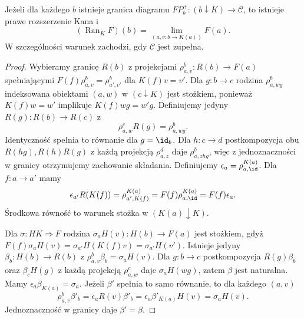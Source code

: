 \begin{twierdzenie}\label{cat:thm:pointwise-ran}
Jeżeli dla każdego $b$ istnieje granica diagramu $FP_b^+:(b\downarrow K)\to\mathcal C$, to istnieje prawe rozszerzenie Kana i
\[
 (\operatorname{Ran}_K F)(b)=\lim_{(a,v:b\to K(a))}F(a).
\]
W szczególności warunek zachodzi, gdy $\mathcal C$ jest zupełna.
\end{twierdzenie}
\begin{proof}
Wybieramy granicę $R(b)$ z projekcjami $\rho^b_{a,v}:R(b)\to F(a)$ spełniającymi $F(f)\rho^b_{a,v}=\rho^b_{a',v'}$ dla $K(f)v=v'$. Dla $g:b\to c$ rodzina $\rho^b_{a,wg}$ indeksowana obiektami $(a,w)$ w $(c\downarrow K)$ jest stożkiem, ponieważ $K(f)w=w'$ implikuje $K(f)wg=w'g$. Definiujemy jedyny $R(g):R(b)\to R(c)$ z
\begin{equation}\label{cat:eq:ran-action}
 \rho^c_{a,w}R(g)=\rho^b_{a,wg}.
\end{equation}
Identyczność spełnia to równanie dla $g=\id_b$. Dla $h:c\to d$ postkompozycja obu $R(hg),R(h)R(g)$ z każdą projekcją $\rho^d_{a,z}$ daje $\rho^b_{a,zhg}$, więc z jednoznaczności w granicy otrzymujemy zachowanie składania.
Definiujemy $\epsilon_a=\rho^{K(a)}_{a,\id}$. Dla $f:a\to a'$ mamy
\[
 \epsilon_{a'}R(K(f))=\rho^{K(a)}_{a',K(f)}
 =F(f)\rho^{K(a)}_{a,\id}=F(f)\epsilon_a.
\]
Środkowa równość to warunek stożka w $(K(a)\downarrow K)$.

Dla $\sigma:HK\Rightarrow F$ rodzina $\sigma_a H(v):H(b)\to F(a)$ jest stożkiem, gdyż $F(f)\sigma_a H(v)=\sigma_{a'}H(K(f)v)=\sigma_{a'}H(v')$. Istnieje jedyny $\beta_b:H(b)\to R(b)$ z $\rho^b_{a,v}\beta_b=\sigma_a H(v)$. Dla $g:b\to c$ postkompozycja $R(g)\beta_b$ oraz $\beta_c H(g)$ z każdą projekcją $\rho^c_{a,w}$ daje $\sigma_a H(wg)$, zatem $\beta$ jest naturalna. Mamy $\epsilon_a\beta_{K(a)}=\sigma_a$. Jeżeli $\beta'$ spełnia to samo równanie, to dla każdego $(a,v)$
\[
 \rho^b_{a,v}\beta'_b=\epsilon_a R(v)\beta'_b
 =\epsilon_a\beta'_{K(a)} H(v)=\sigma_a H(v).
\]
Jednoznaczność w granicy daje $\beta'=\beta$.
\end{proof}
